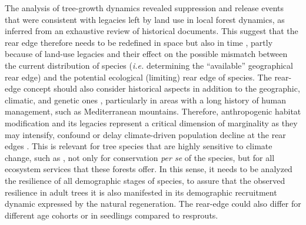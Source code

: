 The analysis of tree-growth dynamics revealed suppression and release events that were consistent with legacies left by land use in local forest dynamics, as inferred from an exhaustive review of historical documents. This suggest that the rear edge therefore needs to be redefined in space but also in time \autocite{VilaCabreraetal2019RefiningPredictions}, partly because of land-use legacies and their effect on the possible mismatch between the current distribution of species (\emph{i.e.} determining the ``available'' geographical rear edge) and the potential ecological (limiting) rear edge of species. The rear-edge concept should also consider historical aspects in addition to the geographic, climatic, and genetic ones \autocite{VilaCabreraetal2019RefiningPredictions}, particularly in areas with a long history of human management, such as Mediterranean mountains. Therefore, anthropogenic habitat modification and its legacies represent a critical dimension of marginality as they may intensify, confound or delay climate-driven population decline at the rear edges \autocite{VilaCabreraetal2019RefiningPredictions}. This is relevant for tree species that are highly sensitive to climate change, such as \Qpy, not only for conservation \emph{per se} of the species, but for all ecosystem services that these forests offer. In this sense, it needs to be analyzed the resilience of all demographic stages of species, to assure that the observed resilience in adult trees it is also manifested in its demographic recruitment dynamic expressed by the natural regeneration. The rear-edge could also differ for different age cohorts or in seedlings compared to resprouts.
